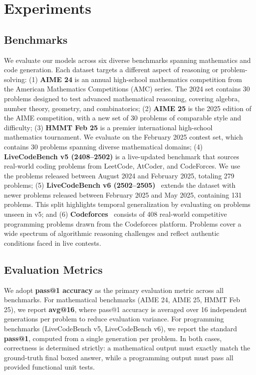   \section{Experiments}
  
  \subsection{Benchmarks}
  
  We evaluate our models across six diverse benchmarks spanning mathematics and code generation. 
  Each dataset targets a different aspect of reasoning or problem-solving: 
  (1) \textbf{AIME 24} is an annual high-school mathematics competition from the American Mathematics Competitions (AMC) series. The 2024 set contains 30 problems designed to test advanced mathematical reasoning, covering algebra, number theory, geometry, and combinatorics;
  (2) \textbf{AIME 25} is the 2025 edition of the AIME competition, with a new set of 30 problems of comparable style and difficulty;
  (3) \textbf{HMMT Feb 25} is a premier international high-school mathematics tournament. We evaluate on the February 2025 contest set, which contains 30 problems spanning diverse mathematical domains;
  (4) \textbf{LiveCodeBench v5 (2408–2502)} \citep{jain2024livecodebench} is a live-updated benchmark that sources real-world coding problems from LeetCode, AtCoder, and CodeForces. We use the problems released between August 2024 and February 2025, totaling 279 problems;
  (5) \textbf{LiveCodeBench v6 (2502–2505)}~\citep{jain2024livecodebench} extends the dataset with newer problems released between February 2025 and May 2025, containing 131 problems. This split highlights temporal generalization by evaluating on problems unseen in v5;
  and (6) \textbf{Codeforces}~\citep{quan2025codeelo} consists of 408 real-world competitive programming problems drawn from the Codeforces platform. Problems cover a wide spectrum of algorithmic reasoning challenges and reflect authentic conditions faced in live contests.  
  
  \subsection{Evaluation Metrics}
  
  We adopt \textbf{pass@1 accuracy} as the primary evaluation metric across all benchmarks. 
  For mathematical benchmarks (AIME 24, AIME 25, HMMT Feb 25), we report \textbf{avg@16}, where pass@1 accuracy is averaged over 16 independent generations per problem to reduce evaluation variance. 
  For programming benchmarks (LiveCodeBench v5, LiveCodeBench v6), we report the standard \textbf{pass@1}, computed from a single generation per problem. 
  In both cases, correctness is determined strictly: a mathematical output must exactly match the ground-truth final boxed answer, while a programming output must pass all provided functional unit tests. 
  
